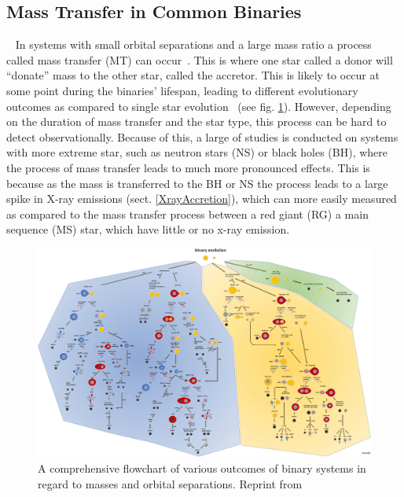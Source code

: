 \documentclass[12pt, a4paper]{article}
\begin{document}
    \subsection{Mass Transfer in Common Binaries}~\label{MassTransferinCommon}
    In systems with small orbital separations and a large mass ratio a process called mass transfer (MT) can occur~\cite{TaurisvandenHeuvel+2023}. This is where one star called a donor will ``donate'' mass to the other star, called the accretor. This is likely to occur at some point during the binaries' lifespan, leading to different evolutionary outcomes as compared to single star evolution~\cite{TaurisvandenHeuvel+2023} (see fig. \ref{fig:binary_evolution_flowchart}). However, depending on the duration of mass transfer and the star type, this process can be hard to detect observationally. Because of this, a large of studies is conducted on systems with more extreme star, such as neutron stars (NS) or black holes (BH), where the process of mass transfer leads to much more pronounced effects. This is because as the mass is transferred to the BH or NS the process leads to a large spike in X-ray emissions (sect. \ref{XrayAccretion}), which can more easily measured as compared to the mass transfer process between a red giant (RG) a main sequence (MS) star, which have little or no x-ray emission. 

    \vspace*{\fill}
    \begin{figure}[H]
        \centering
        \includegraphics[width=\textwidth]{figs/Binary Evolution Flowchart.jpg}
        \caption{A comprehensive flowchart of various outcomes of binary systems in regard to masses and orbital separations. Reprint from \cite{Chen_2024}}
        \label{fig:binary_evolution_flowchart}
    \end{figure}
    \vspace*{\fill}
    \restoregeometry
\end{document}
